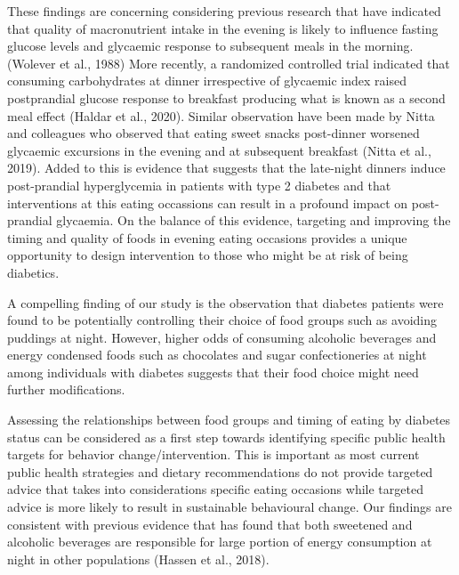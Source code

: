 \documentclass[utf8]{frontiersSCNS}
\begin{document}
These findings are concerning considering previous research that have
indicated that quality of macronutrient intake in the evening is likely
to influence fasting glucose levels and glycaemic response to subsequent
meals in the morning. (Wolever et al., 1988) More recently, a randomized
controlled trial indicated that consuming carbohydrates at dinner
irrespective of glycaemic index raised postprandial glucose response to
breakfast producing what is known as a second meal effect (Haldar et
al., 2020). Similar observation have been made by Nitta and colleagues
who observed that eating sweet snacks post-dinner worsened glycaemic
excursions in the evening and at subsequent breakfast (Nitta et al.,
2019). Added to this is evidence that suggests that the late-night
dinners induce post-prandial hyperglycemia in patients with type 2
diabetes and that interventions at this eating occassions can result in
a profound impact on post-prandial glycaemia. On the balance of this
evidence, targeting and improving the timing and quality of foods in
evening eating occasions provides a unique opportunity to design
intervention to those who might be at risk of being diabetics.

A compelling finding of our study is the observation that diabetes
patients were found to be potentially controlling their choice of food
groups such as avoiding puddings at night. However, higher odds of
consuming alcoholic beverages and energy condensed foods such as
chocolates and sugar confectioneries at night among individuals with
diabetes suggests that their food choice might need further
modifications.

Assessing the relationships between food groups and timing of eating by
diabetes status can be considered as a first step towards identifying
specific public health targets for behavior change/intervention. This is
important as most current public health strategies and dietary
recommendations do not provide targeted advice that takes into
considerations specific eating occasions while targeted advice is more
likely to result in sustainable behavioural change. Our findings are
consistent with previous evidence that has found that both sweetened and
alcoholic beverages are responsible for large portion of energy
consumption at night in other populations (Hassen et al., 2018).
\end{document}
